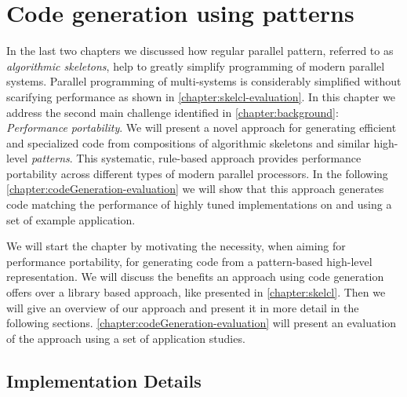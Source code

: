 
\chapter{Code generation using patterns}

\label{ch:fifth} %
\label{chapter:codeGeneration}

In the last two chapters we discussed how regular parallel pattern, referred to as \emph{algorithmic skeletons}, help to greatly simplify programming of modern parallel systems.
Parallel programming of multi-\GPU systems is considerably simplified without scarifying performance as shown in \autoref{chapter:skelcl-evaluation}.
In this chapter we address the second main challenge identified in \autoref{chapter:background}: \emph{Performance portability}.
We will present a novel approach for generating efficient and specialized code from compositions of algorithmic skeletons and similar high-level \emph{patterns}.
This systematic, rule-based approach provides performance portability across different types of modern parallel processors. 
In the following \autoref{chapter:codeGeneration-evaluation} we will show that this approach generates code matching the performance of highly tuned implementations on \CPUs and \GPUs using a set of example application.

We will start the chapter by motivating the necessity, when aiming for performance portability, for generating code from a pattern-based high-level representation.
We will discuss the benefits an approach using code generation offers over a library based approach, like \SkelCL presented in \autoref{chapter:skelcl}.
Then we will give an overview of our approach and present it in more detail in the following sections.
\autoref{chapter:codeGeneration-evaluation} will present an evaluation of the approach using a set of application studies.









\section{Implementation Details}

